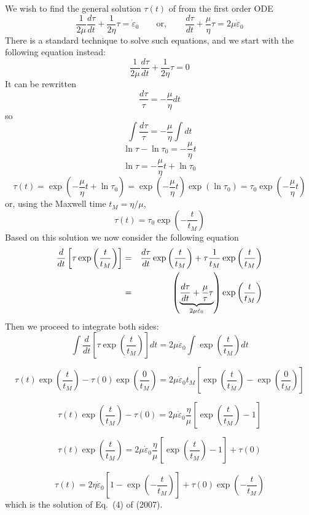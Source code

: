 We wish to find the general solution $\tau(t)$ of from the first order ODE
\[
\frac{1}{2\mu} \frac{d\tau}{dt} + \frac{1}{2\eta} \tau = \dot\varepsilon_0
\qquad
\text{or},
\qquad
\frac{d\tau}{dt} + \frac{\mu}{\eta} \tau = 2\mu \dot\varepsilon_0
\]
There is a standard technique to solve such equations, and we start with the following equation instead:
\[
\frac{1}{2\mu} \frac{d\tau}{dt} + \frac{1}{2\eta} \tau = 0
\]
It can be rewritten
\[
\frac{d\tau}{\tau} = -\frac{\mu}{\eta} dt
\]
so
\[
\int \frac{d\tau}{\tau} = -\frac{\mu}{\eta} \int dt
\]
\[
\ln \tau - \ln \tau_0 = -\frac{\mu}{\eta} t 
\]
\[
\ln \tau = -\frac{\mu}{\eta} t  + \ln \tau_0
\]
\[
\tau(t) 
= \exp \left(  -\frac{\mu}{\eta} t  + \ln \tau_0 \right) 
= \exp \left(  -\frac{\mu}{\eta} t   \right)   \exp \left(  \ln \tau_0 \right) 
= \tau_0 \exp \left(  -\frac{\mu}{\eta} t   \right) 
\]
or, using the Maxwell time $t_M=\eta/\mu$,
\[
\tau(t) 
= \tau_0 \exp \left(  -\frac{t}{t_M}   \right) 
\]
Based on this solution we now 
consider the following equation
\begin{eqnarray}
\frac{d}{dt} \left[   \tau \exp\left( \frac{t}{t_M}   \right)  \right]
&=& 
\frac{d \tau}{dt}  \exp\left( \frac{t}{t_M}   \right)  +
\tau \frac{1}{t_M} \exp\left( \frac{t}{t_M}   \right)  \nonumber\\
&=& 
\left( \underbrace{\frac{d \tau}{dt} + \frac{\mu}{\tau} \tau}_{2\mu \dot\varepsilon_0}  \right)  \exp\left( \frac{t}{t_M}   \right)  \nonumber
\end{eqnarray}
Then we proceed to integrate both sides:
\[
\int \frac{d}{dt} \left[   \tau \exp\left( \frac{t}{t_M}   \right)  \right] dt
= 2\mu \dot\varepsilon_0 \int \exp\left( \frac{t}{t_M}   \right)  dt
\]

\[
\tau(t) \exp\left( \frac{t}{t_M}   \right)
-
\tau(0) \exp\left( \frac{0}{t_M}   \right)
 =
 2\mu \dot\varepsilon_0  t_M  [ \exp\left( \frac{t}{t_M}   \right)  -  \exp\left( \frac{0}{t_M} \right) ]
\]

\[
\tau(t) \exp\left( \frac{t}{t_M}   \right)
- \tau(0) 
=
2 \mu  \dot\varepsilon_0 \frac{\eta}{\mu} [ \exp\left( \frac{t}{t_M}   \right) -1 ]
\]

\[
\tau(t) \exp\left( \frac{t}{t_M} \right)
=
2 \mu  \dot\varepsilon_0 \frac{\eta}{\mu} [ \exp\left( \frac{t}{t_M}   \right) -1 ] + \tau(0) 
\]

\[
\tau(t) 
=
2 \eta  \dot\varepsilon_0  [1- \exp\left( -\frac{t}{t_M}\right) ] + \tau(0) \exp\left( -\frac{t}{t_M} \right)
\]
which is the solution of Eq.~(4) of \textcite{kabe07} (2007).





















